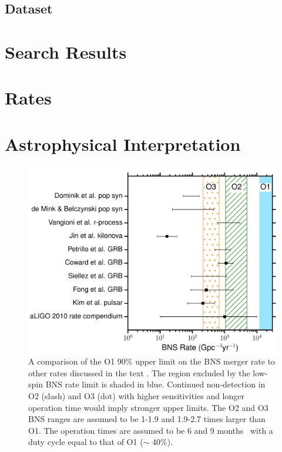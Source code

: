   \subsection{Dataset}
  \label{ssec:dataset}
  

\section{Search Results}
\label{sec:search_results}


\section{Rates}
\label{sec:rates}


\section{Astrophysical Interpretation}
\label{sec:astrophys_interp}

\begin{figure}[t]
\centering
\includegraphics[width=\textwidth]{figs/chapter3/figure6}
\caption{\label{fig:ratecomparebns} A comparison of the \ac{O1} 90\% upper limit on the
\ac{BNS} merger rate to other rates discussed in the text \protect\citep{
Abadie:2010cf, Kim:2013tca, Fong:2015oha, Siellez:2013hia, Coward:2012gn,
Petrillo:2012ij, Jin:2015txa, Vangioni:2015ofa, deMink:2015yea, Dominik:2014yma}.  The region excluded by the low-spin \ac{BNS} rate limit is
shaded in blue.  Continued non-detection in O2 (slash) and O3 (dot) with higher
sensitivities and longer operation time would imply stronger upper limits.  The
O2 and O3 \ac{BNS} ranges are assumed to be 1-1.9 and 1.9-2.7 times larger than
\ac{O1}.  The operation times are assumed to be 6 and 9
months~\citep{Aasi:2013wya} with a duty cycle equal to that of \ac{O1} ($\sim$ 40\%).}
\end{figure}

